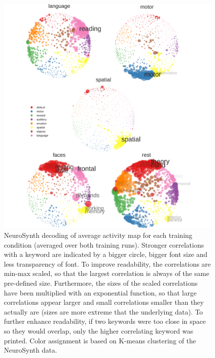 \documentclass[fleqn,10pt]{SelfArx} %
\begin{document}
\begin{figure}[htbp]
	\begin{minipage}{\textwidth}
		\renewcommand{\familydefault}{\sfdefault}\normalfont
		\centering
		\includegraphics[width=\columnwidth]{./figs/fig5_nsSpaceTrain.png}
				\vspace*{-3mm}
		\caption{NeuroSynth decoding of average activity map for each training condition (averaged over both training runs). Stronger correlations with a keyword are indicated by a bigger circle, bigger font size and less transparency of font. To improve readability, the correlations are min-max scaled, so that the largest correlation is always of the same pre-defined size. Furthermore, the sizes of the scaled correlations have been multiplied with an exponential function, so that large correlations appear larger and small correlations smaller than they actually are (sizes are more extreme that the underlying data). To further enhance readability, if two keywords were too close in space so they would overlap, only the higher correlating keyword was printed. Color assignment is based on K-means clustering of the NeuroSynth data.}%
		\label{fig:trainNs}
	\end{minipage}
\end{figure}
\end{document}
